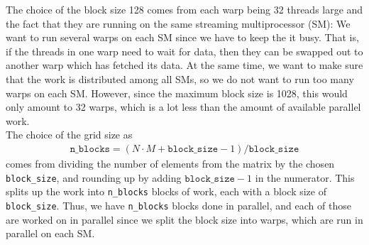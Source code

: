 \documentclass[9pt]{article}
\begin{document}
The choice of the block size 128 comes from each warp being 32 threads large and the fact that they are running on the same streaming multiprocessor (SM): We want to run several warps on each SM since we have to keep the it busy. That is, if the threads in one warp need to wait for data, then they can be swapped out to another warp which has fetched its data. At the same time, we want to make sure that the work is distributed among all SMs, so we do not want to run too many warps on each SM. However, since the maximum block size is 1028, this would only amount to 32 warps, which is a lot less than the amount of available parallel work. \\

The choice of the grid size as 
\begin{align*}
	\texttt{n\_blocks}=(N \cdot M +\texttt{block\_size} - 1) / \texttt{block\_size}
\end{align*}
comes from dividing the number of elements from the matrix by the chosen \texttt{block\_size}, and rounding up by adding $\texttt{block\_size} - 1$ in the numerator. This splits up the work into \texttt{n\_blocks} blocks of work, each with a block size of \texttt{block\_size}. Thus, we have \texttt{n\_blocks} blocks done in parallel, and each of those are worked on in parallel since we split the block size into warps, which are run in parallel on each SM. \\
\end{document}
